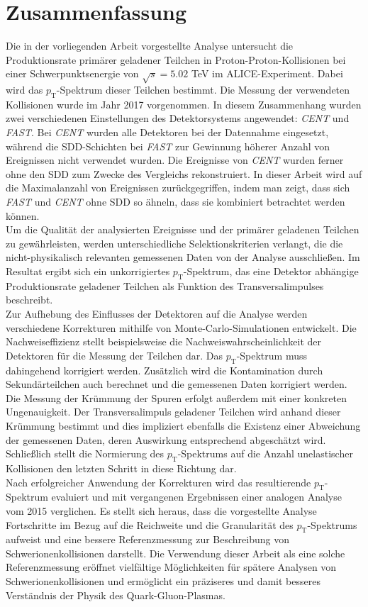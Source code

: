 \documentclass[12pt,a4paper]{report}
\begin{document}
\chapter{Zusammenfassung}
Die in der vorliegenden Arbeit vorgestellte Analyse untersucht die Produktionsrate primärer geladener Teilchen in Proton-Proton-Kollisionen bei einer Schwerpunktsenergie von $\sqrt{s} = 5.02$ TeV im ALICE-Experiment. Dabei wird das $p_{\mathrm{T}}$-Spektrum dieser Teilchen bestimmt. Die Messung der verwendeten Kollisionen wurde im Jahr 2017 vorgenommen. In diesem Zusammenhang wurden zwei verschiedenen Einstellungen des Detektorsystems angewendet: \textit{CENT} und \textit{FAST}. Bei \textit{CENT} wurden alle Detektoren bei der Datennahme eingesetzt, während die SDD-Schichten bei \textit{FAST} zur Gewinnung höherer Anzahl von Ereignissen nicht verwendet wurden. Die Ereignisse von \textit{CENT} wurden ferner ohne den SDD zum Zwecke des Vergleichs rekonstruiert. In dieser Arbeit wird auf die Maximalanzahl von Ereignissen zurückgegriffen, indem man zeigt, dass sich \textit{FAST} und \textit{CENT} ohne SDD so ähneln, dass sie kombiniert betrachtet werden können.\\
Um die Qualität der analysierten Ereignisse und der primärer geladenen Teilchen zu gewährleisten, werden unterschiedliche Selektionskriterien verlangt, die die nicht-physikalisch relevanten gemessenen Daten von der Analyse ausschließen. Im Resultat ergibt sich ein unkorrigiertes $p_{\mathrm{T}}$-Spektrum, das eine Detektor abhängige Produktionsrate geladener Teilchen als Funktion des Transversalimpulses beschreibt.\\
Zur Aufhebung des Einflusses der Detektoren auf die Analyse werden verschiedene Korrekturen mithilfe von Monte-Carlo-Simulationen entwickelt. Die Nachweis\-effizienz stellt beispielsweise die Nachweiswahrscheinlichkeit der Detektoren für die Messung der Teilchen dar. Das $p_{\mathrm{T}}$-Spektrum muss dahingehend korrigiert werden. Zusätzlich wird die Kontamination durch Sekundärteilchen auch berechnet und die gemessenen Daten korrigiert werden. Die Messung der Krümmung der Spuren erfolgt außerdem mit einer konkreten Ungenauigkeit. Der Transversalimpuls geladener Teilchen wird anhand dieser Krümmung bestimmt und dies impliziert ebenfalls die Existenz einer Abweichung der gemessenen Daten, deren Auswirkung entsprechend abgeschätzt wird. Schließlich stellt die Normierung des $p_{\mathrm{T}}$-Spektrums auf die Anzahl unelastischer Kollisionen den letzten Schritt in diese Richtung dar.\\
Nach erfolgreicher Anwendung der Korrekturen wird das resultierende $p_{\mathrm{T}}$-Spektrum evaluiert und mit vergangenen Ergebnissen einer analogen Analyse vom 2015 verglichen. Es stellt sich heraus, dass die vorgestellte Analyse Fortschritte im Bezug auf die Reichweite und die Granularität des $p_{\mathrm{T}}$-Spektrums aufweist und eine bessere Referenzmessung zur Beschreibung von Schwerionenkollisionen darstellt. Die Verwendung dieser Arbeit als eine solche Referenzmessung eröffnet vielfältige Möglichkeiten für spätere Analysen von Schwerionenkollisionen und ermöglicht ein präziseres und damit besseres Verständnis der Physik des Quark-Gluon-Plasmas.
\end{document}
